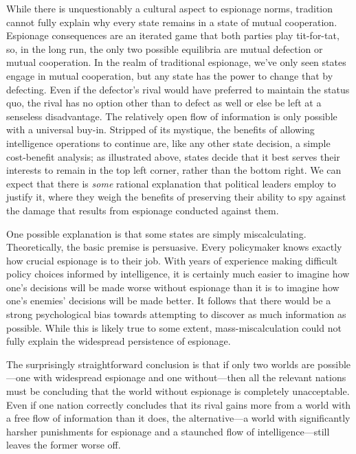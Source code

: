 \documentclass[12pt]{extarticle}
\begin{document}
While there is unquestionably a cultural aspect to espionage norms, tradition cannot fully explain why every state remains in a state of mutual cooperation. Espionage consequences are an iterated game that both parties play tit-for-tat, so, in the long run, the only two possible equilibria are mutual defection or mutual cooperation. In the realm of traditional espionage, we've only seen states engage in mutual cooperation, but any state has the power to change that by defecting. Even if the defector's rival would have preferred to maintain the status quo, the rival has no option other than to defect as well or else be left at a senseless disadvantage. The relatively open flow of information is only possible with a universal buy-in. Stripped of its mystique, the benefits of allowing intelligence operations to continue are, like any other state decision, a simple cost-benefit analysis; as illustrated above, states decide that it best serves their interests to remain in the top left corner, rather than the bottom right. We can expect that there is \emph{some} rational explanation that political leaders employ to justify it, where they weigh the benefits of preserving their ability to spy against the damage that results from espionage conducted against them.


One possible explanation is that some states are simply miscalculating. Theoretically, the basic premise is persuasive. Every policymaker knows exactly how crucial espionage is to their job. With years of experience making difficult policy choices informed by intelligence, it is certainly much easier to imagine how one's decisions will be made worse without espionage than it is to imagine how one's enemies' decisions will be made better. It follows that there would be a strong psychological bias towards attempting to discover as much information as possible. While this is likely true to some extent, mass-miscalculation could not fully explain the widespread persistence of espionage.

The surprisingly straightforward conclusion is that if only two worlds are possible---one with widespread espionage and one without---then all the relevant nations must be concluding that the world without espionage is completely unacceptable. Even if one nation correctly concludes that its rival gains more from a world with a free flow of information than it does, the alternative---a world with significantly harsher punishments for espionage and a staunched flow of intelligence---still leaves the former worse off.
\end{document}
